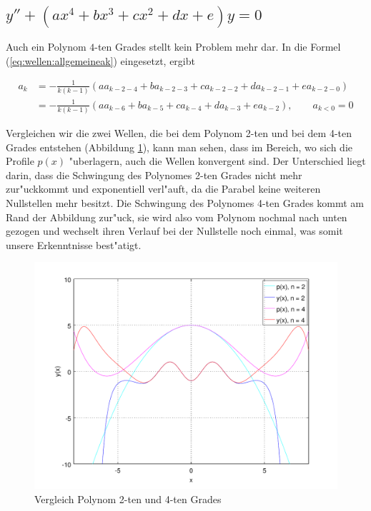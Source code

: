 \subsection{\texorpdfstring{$y''+(ax^4+bx^3+cx^2+dx+e)y = 
0$}{y''-(ax4+bx3+cx2+dx+e)y = 0}}

Auch ein Polynom $4$-ten Grades stellt kein Problem mehr dar. In die 
Formel (\ref{eq:wellen:allgemeineak}) eingesetzt, ergibt

\begin{equation*}
	\begin{split}
		a_k &= -\frac{1}{k(k-1)} (aa_{k-2-4} + 
		ba_{k-2-3} + ca_{k-2-2} + da_{k-2-1} +ea_{k-2-0})
		\\
		&= -\frac{1}{k(k-1)} (aa_{k-6} + ba_{k-5} + 
		ca_{k-4} + da_{k-3} +ea_{k-2}), \qquad a_{k<0} = 0
	\end{split}
\end{equation*}

Vergleichen wir die zwei Wellen, die bei dem Polynom 2-ten und bei dem 
4-ten Grades entstehen (Abbildung \ref{fig:wellen:poly4-dgl}), kann man sehen, 
dass im Bereich, wo sich die Profile $p(x)$ "uberlagern, auch die Wellen 
konvergent sind. Der Unterschied liegt darin, dass die Schwingung des Polynomes 
2-ten Grades nicht mehr zur"uckkommt und exponentiell verl"auft, da die Parabel 
keine weiteren Nullstellen mehr besitzt. Die Schwingung des Polynomes 4-ten 
Grades kommt am Rand der Abbildung zur"uck, sie wird also vom Polynom nochmal 
nach unten gezogen und wechselt ihren Verlauf bei der Nullstelle noch einmal, 
was somit unsere Erkenntnisse best"atigt. 

\begin{figure}
	\includegraphics[scale=0.65]{./wellen/images/allgemein/n4.pdf}
	\caption{Vergleich Polynom 2-ten und 4-ten Grades}
	\label{fig:wellen:poly4-dgl}
\end{figure}